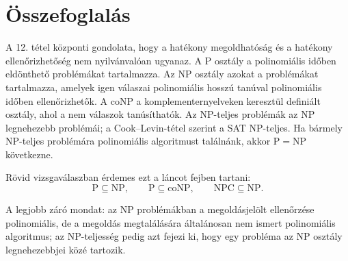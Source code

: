 \section{Összefoglalás}

\begin{summarybox}
A 12. tétel központi gondolata, hogy a hatékony megoldhatóság és a hatékony ellenőrizhetőség nem nyilvánvalóan ugyanaz. A $\mathrm{P}$ osztály a polinomiális időben eldönthető problémákat tartalmazza. Az $\mathrm{NP}$ osztály azokat a problémákat tartalmazza, amelyek igen válaszai polinomiális hosszú tanúval polinomiális időben ellenőrizhetők. A $\mathrm{coNP}$ a komplementernyelveken keresztül definiált osztály, ahol a nem válaszok tanúsíthatók. Az NP-teljes problémák az $\mathrm{NP}$ legnehezebb problémái; a Cook--Levin-tétel szerint a SAT NP-teljes. Ha bármely NP-teljes problémára polinomiális algoritmust találnánk, akkor $\mathrm{P}=\mathrm{NP}$ következne.
\end{summarybox}

Rövid vizsgaválaszban érdemes ezt a láncot fejben tartani:
\[
  \mathrm{P}\subseteq\mathrm{NP},
  \qquad
  \mathrm{P}\subseteq\mathrm{coNP},
  \qquad
  \mathrm{NPC}\subseteq\mathrm{NP}.
\]

A legjobb záró mondat: az $\mathrm{NP}$ problémákban a megoldásjelölt ellenőrzése polinomiális, de a megoldás megtalálására általánosan nem ismert polinomiális algoritmus; az NP-teljesség pedig azt fejezi ki, hogy egy probléma az $\mathrm{NP}$ osztály legnehezebbjei közé tartozik.
